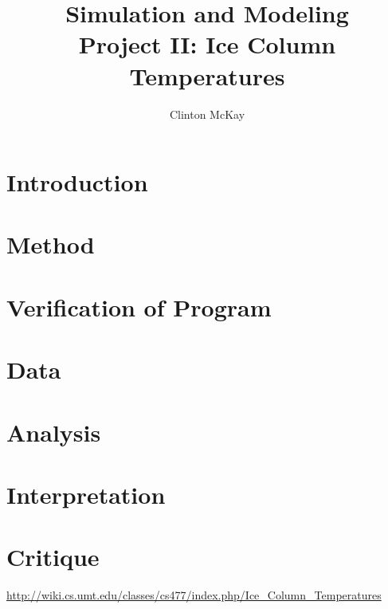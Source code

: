 \documentclass{article}%
\begin{document}
    \title{Simulation and Modeling\\Project II: Ice Column Temperatures}
    \author{Clinton McKay}
    \maketitle

    \twocolumn

    \section{Introduction}

    \section{Method}

    \section{Verification of Program}

    \section{Data}
    
    \section{Analysis}
    
    \section{Interpretation}

    \section{Critique} 

    \begin{thebibliography}{1}
        \url{http://wiki.cs.umt.edu/classes/cs477/index.php/Ice\_Column\_Temperatures}
    \end{thebibliography} 
\end{document}
